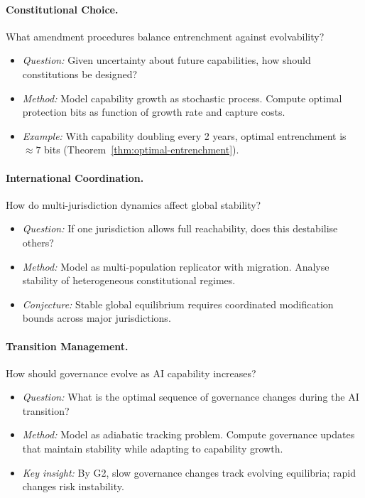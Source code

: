 \documentclass[12pt]{article}
\begin{document}
\paragraph{Constitutional Choice.} What amendment procedures balance entrenchment against evolvability?
\begin{itemize}
    \item \textit{Question:} Given uncertainty about future capabilities, how should constitutions be designed?
    \item \textit{Method:} Model capability growth as stochastic process. Compute optimal protection bits as function of growth rate and capture costs.
    \item \textit{Example:} With capability doubling every 2 years, optimal entrenchment is $\approx 7$ bits (Theorem~\ref{thm:optimal-entrenchment}).
\end{itemize}

\paragraph{International Coordination.} How do multi-jurisdiction dynamics affect global stability?
\begin{itemize}
    \item \textit{Question:} If one jurisdiction allows full reachability, does this destabilise others?
    \item \textit{Method:} Model as multi-population replicator with migration. Analyse stability of heterogeneous constitutional regimes.
    \item \textit{Conjecture:} Stable global equilibrium requires coordinated modification bounds across major jurisdictions.
\end{itemize}

\paragraph{Transition Management.} How should governance evolve as AI capability increases?
\begin{itemize}
    \item \textit{Question:} What is the optimal sequence of governance changes during the AI transition?
    \item \textit{Method:} Model as adiabatic tracking problem. Compute governance updates that maintain stability while adapting to capability growth.
    \item \textit{Key insight:} By G2, slow governance changes track evolving equilibria; rapid changes risk instability.
\end{itemize}
\end{document}
